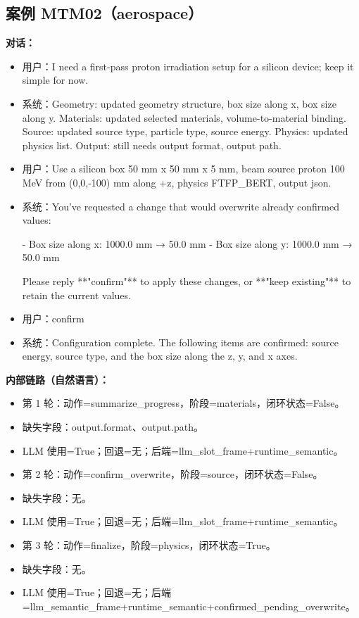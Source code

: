 \documentclass[11pt]{ctexart}
\begin{document}
\subsection{案例 MTM02（aerospace）}
\textbf{对话：}
\begin{itemize}
\item 用户：I need a first-pass proton irradiation setup for a silicon device; keep it simple for now.
\item 系统：Geometry: updated geometry structure, box size along x, box size along y. Materials: updated selected materials, volume-to-material binding. Source: updated source type, particle type, source energy. Physics: updated physics list. Output: still needs output format, output path.
\item 用户：Use a silicon box 50 mm x 50 mm x 5 mm, beam source proton 100 MeV from (0,0,-100) mm along +z, physics FTFP\_BERT, output json.
\item 系统：You've requested a change that would overwrite already confirmed values:

- Box size along x: 1000.0 mm → 50.0 mm
- Box size along y: 1000.0 mm → 50.0 mm

Please reply **"confirm"** to apply these changes, or **"keep existing"** to retain the current values.
\item 用户：confirm
\item 系统：Configuration complete. The following items are confirmed: source energy, source type, and the box size along the z, y, and x axes.
\end{itemize}
\textbf{内部链路（自然语言）：}
\begin{itemize}
\item 第 1 轮：动作=summarize\_progress，阶段=materials，闭环状态=False。
\item 缺失字段：output.format、output.path。
\item LLM 使用=True；回退=无；后端=llm\_slot\_frame+runtime\_semantic。
\item 第 2 轮：动作=confirm\_overwrite，阶段=source，闭环状态=False。
\item 缺失字段：无。
\item LLM 使用=True；回退=无；后端=llm\_slot\_frame+runtime\_semantic。
\item 第 3 轮：动作=finalize，阶段=physics，闭环状态=True。
\item 缺失字段：无。
\item LLM 使用=True；回退=无；后端=llm\_semantic\_frame+runtime\_semantic+confirmed\_pending\_overwrite。
\end{itemize}
\end{document}
